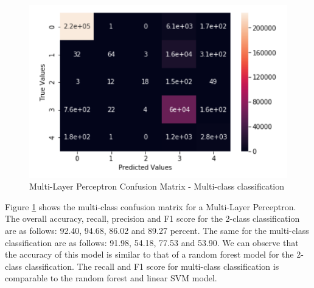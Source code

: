 \begin{figure}
	\includegraphics[width=1.0\columnwidth]{images/nnall.PNG}
	\caption{Multi-Layer Perceptron Confusion Matrix - Multi-class classification}
	\label{F:nnall}
\end{figure}
Figure \ref{F:nnall} shows the multi-class confusion matrix for a Multi-Layer Perceptron.\\
The overall accuracy, recall, precision and F1 score for the 2-class classification are as follows: 92.40, 94.68, 86.02 and 89.27 percent. The same for the multi-class classification are as follows: 91.98, 54.18, 77.53
and 53.90. We can observe that the accuracy of this model is similar to that of a random forest model for the 2-class classification. The recall and F1 score for multi-class classification is comparable to the random forest and linear SVM model.

